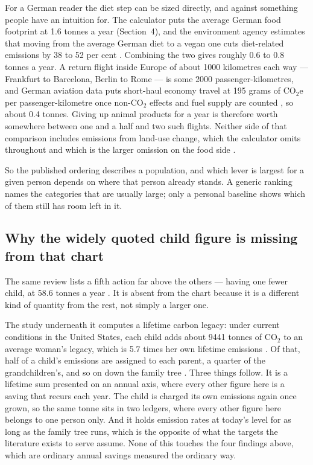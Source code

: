 \documentclass[11pt,a4paper]{article}
\begin{document}
For a German reader the diet step can be sized directly, and against something people
have an intuition for. The calculator puts the average German food footprint at 1.6
tonnes a year (Section~4), and the environment agency estimates that moving from the
average German diet to a vegan one cuts diet-related emissions by 38 to 52 per cent
\cite{uba-tierhaltung}. Combining the two gives roughly 0.6 to 0.8 tonnes a year. A
return flight inside Europe of about 1000 kilometres each way — Frankfurt to
Barcelona, Berlin to Rome — is some 2000 passenger-kilometres, and German aviation
data puts short-haul economy travel at 195 grams of CO$_2$e per passenger-kilometre
once non-CO$_2$ effects and fuel supply are counted \cite{ifeu}, so about 0.4 tonnes.
Giving up animal products for a year is therefore worth somewhere between one and a
half and two such flights. Neither side of that comparison includes emissions from
land-use change, which the calculator omits throughout and which is the larger
omission on the food side \cite{uba-rechner}.

So the published ordering describes a population, and which lever is largest for a
given person depends on where that person already stands. A generic ranking names the
categories that are usually large; only a personal baseline shows which of them still
has room left in it.

\subsection{Why the widely quoted child figure is missing from that chart}

The same review lists a fifth action far above the others — having one fewer child, at
58.6 tonnes a year \cite{wynes}. It is absent from the chart because it is a different
kind of quantity from the rest, not simply a larger one.

The study underneath it computes a lifetime carbon legacy: under current conditions in
the United States, each child adds about 9441 tonnes of CO$_2$ to an average woman's
legacy, which is 5.7 times her own lifetime emissions \cite{murtaugh}. Of that, half
of a child's emissions are assigned to each parent, a quarter of the grandchildren's,
and so on down the family tree \cite{wynes}. Three things follow. It is a lifetime sum
presented on an annual axis, where every other figure here is a saving that recurs
each year. The child is charged its own emissions again once grown, so the same tonne
sits in two ledgers, where every other figure here belongs to one person only. And it
holds emission rates at today's level for as long as the family tree runs, which is
the opposite of what the targets the literature exists to serve assume. None of this
touches the four findings above, which are ordinary annual savings measured the
ordinary way.
\end{document}
